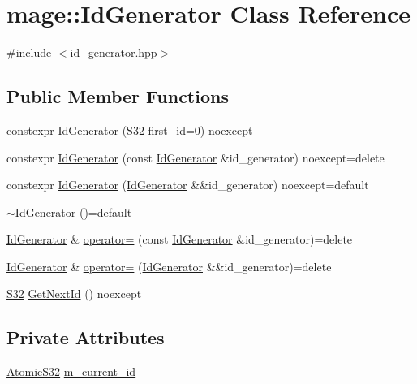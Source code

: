 \hypertarget{classmage_1_1_id_generator}{}\section{mage\+:\+:Id\+Generator Class Reference}
\label{classmage_1_1_id_generator}


{\ttfamily \#include $<$id\+\_\+generator.\+hpp$>$}

\subsection*{Public Member Functions}
\begin{DoxyCompactItemize}
\item 
constexpr \hyperlink{classmage_1_1_id_generator_a62eacd065b27320c207d72acf94df7a3}{Id\+Generator} (\hyperlink{namespacemage_a642e05c5c83642b6946703615cdbf2da}{S32} first\+\_\+id=0) noexcept
\item 
constexpr \hyperlink{classmage_1_1_id_generator_ae7dbf4b3f0e959a923a098172731e562}{Id\+Generator} (const \hyperlink{classmage_1_1_id_generator}{Id\+Generator} \&id\+\_\+generator) noexcept=delete
\item 
constexpr \hyperlink{classmage_1_1_id_generator_a41ff4257bf42f434235f2d092c3b197d}{Id\+Generator} (\hyperlink{classmage_1_1_id_generator}{Id\+Generator} \&\&id\+\_\+generator) noexcept=default
\item 
\hyperlink{classmage_1_1_id_generator_a70161ab5b10294ebba1ace7a3b0f8d31}{$\sim$\+Id\+Generator} ()=default
\item 
\hyperlink{classmage_1_1_id_generator}{Id\+Generator} \& \hyperlink{classmage_1_1_id_generator_a370c8289f38a534006e8b9ca7ec78026}{operator=} (const \hyperlink{classmage_1_1_id_generator}{Id\+Generator} \&id\+\_\+generator)=delete
\item 
\hyperlink{classmage_1_1_id_generator}{Id\+Generator} \& \hyperlink{classmage_1_1_id_generator_aace8082947445d26d2421ba8b361f1bc}{operator=} (\hyperlink{classmage_1_1_id_generator}{Id\+Generator} \&\&id\+\_\+generator)=delete
\item 
\hyperlink{namespacemage_a642e05c5c83642b6946703615cdbf2da}{S32} \hyperlink{classmage_1_1_id_generator_a9e0e86e5feab919f5ac5ab4ad8f51b09}{Get\+Next\+Id} () noexcept
\end{DoxyCompactItemize}
\subsection*{Private Attributes}
\begin{DoxyCompactItemize}
\item 
\hyperlink{namespacemage_a34972c09c02b691cd7cc5ea34db1e778}{Atomic\+S32} \hyperlink{classmage_1_1_id_generator_af834ccd6b694775f434949a1c1382965}{m\+\_\+current\+\_\+id}
\end{DoxyCompactItemize}


